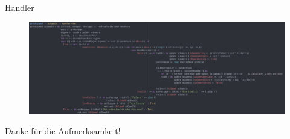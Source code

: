 \documentclass{beamer}
\begin{document}
\begin{frame}{Handler}
\begin{figure}
\includegraphics[width=\linewidth]{aihandler}
\end{figure}
\end{frame}

\begin{frame}[plain,c]
\begin{center}
\Huge Danke f\"ur die Aufmerksamkeit!
\end{center}
\end{frame}
\end{document}
